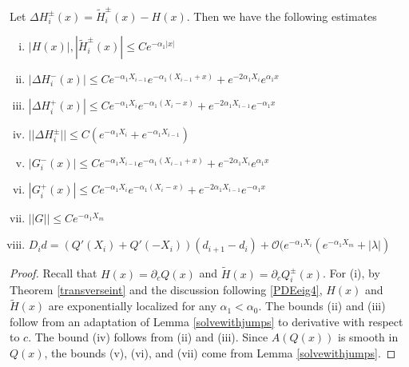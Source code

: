 \documentclass[thesis.tex]{subfiles}
\begin{document}
\begin{lemma}\label{stabestimateslemma}
Let $\Delta H_i^\pm(x) = \tilde{H}_i^\pm(x) - H(x)$. Then we have the following estimates
\begin{enumerate}[(i)]
\item $|H(x)|, |\tilde{H}_i^\pm(x)| \leq C e^{-\alpha_1 |x|}$
\item $|\Delta H_i^-(x)| \leq C e^{-\alpha_1 X_{i-1}} e^{-\alpha_1(X_{i-1} + x) } + e^{-2 \alpha_1 X_i} e^{\alpha_1 x}$
\item $|\Delta H_i^+(x)| \leq C e^{-\alpha_1 X_i} e^{-\alpha_1(X_i - x) } + e^{-2 \alpha_1 X_{i-1}} e^{-\alpha_1 x}$
\item $||\Delta H_i^\pm|| \leq C(e^{-\alpha_1 X_i} + e^{-\alpha_1 X_{i-1}} )$
\item $|G_i^-(x)| \leq C e^{-\alpha_1 X_{i-1}} e^{-\alpha_1(X_{i-1} + x) } + e^{-2 \alpha_1 X_i} e^{\alpha_1 x}$
\item $|G_i^+(x)| \leq C e^{-\alpha_1 X_i} e^{-\alpha_1(X_i - x) } + e^{-2 \alpha_1 X_{i-1}} e^{-\alpha_1 x}$
\item $||G|| \leq C e^{-\alpha_1 X_m}$
\item $D_i d = ( Q'(X_i) + Q'(-X_i))(d_{i+1} - d_i ) + \mathcal{O} ( e^{-\alpha_1 X_i} (e^{-\alpha_1 X_m} + |\lambda| )$
\end{enumerate}
\begin{proof}
Recall that $H(x) = \partial_c Q(x)$ and $\tilde{H}(x) = \partial_c Q_i^\pm(x)$. For (i), by Theorem \ref{transverseint} and the discussion following \eqref{PDEeig4}, $H(x)$ and $\tilde{H}(x)$ are exponentially localized for any $\alpha_1 < \alpha_0$. The bounds (ii) and (iii) follow from an adaptation of Lemma \ref{solvewithjumps} to derivative with respect to $c$. The bound (iv) follows from (ii) and (iii). Since $A(Q(x))$ is smooth in $Q(x)$, the bounds (v), (vi), and (vii) come from Lemma \ref{solvewithjumps}.


\end{proof}
\end{lemma}
\end{document}

